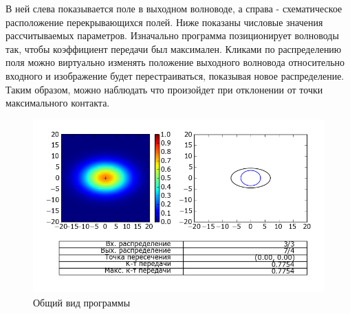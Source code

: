В ней слева показывается поле в выходном волноводе, а справа - схематическое расположение перекрывающихся полей. Ниже показаны числовые значения рассчитываемых параметров. Изначально программа позиционирует волноводы так, чтобы коэффициент передачи был максимален. Кликами по распределению поля можно виртуально изменять положение выходного волновода относительно входного и изображение будет перестраиваться, показывая новое распределение. Таким образом, можно наблюдать что произойдет при отклонении от точки максимального контакта.

\begin{figure}[h!]
	\includegraphics[width=\linewidth]{img/heatmap.png}
	\caption{Общий вид программы}
\end{figure}